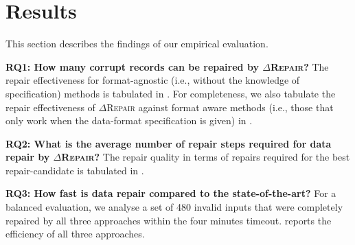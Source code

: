 \documentclass[acmsmall,screen,review,anonymous]{acmart}
\newcommand{\dtask}{data repair\xspace}
\newcommand{\approach}{\textsc{$\Delta$Repair}\xspace}
\newcommand{\drepair}{\approach}
\begin{document}
\section{Results}
\label{sec:results}
This section describes the findings of our empirical evaluation.

\noindent\textbf{RQ1: How many corrupt records can be repaired by \drepair?}
The repair effectiveness for format-agnostic (i.e., without the knowledge of specification)
methods is tabulated in .
For completeness, we also tabulate the repair effectiveness of \drepair against
format aware methods (i.e., those that only work when the data-format specification is given)
in .

\noindent\textbf{RQ2: What is the average number of repair steps required for \dtask by \drepair?}
The repair quality in terms of repairs required for the best repair-candidate is
tabulated in .

\noindent\textbf{RQ3: How fast is \dtask compared to the state-of-the-art?}
For a balanced evaluation, we analyse a set of 480 invalid inputs
that were completely repaired by all three approaches within the four minutes timeout.
reports the efficiency of all three approaches.
\end{document}
